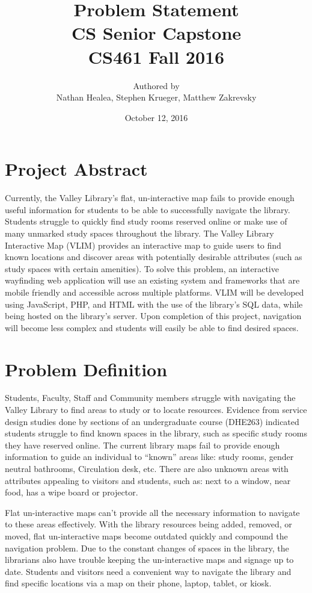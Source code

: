 \documentclass[letterpaper,10pt,titlepage]{article}
\title{Problem Statement \\ CS Senior Capstone \\ \vspace{2mm}\small CS461 Fall 2016}
\author{Authored by \\ Nathan Healea, Stephen Krueger, Matthew Zakrevsky}
\date{October 12, 2016}
\begin{document}
\maketitle
\newpage

\section*{Project Abstract}
Currently, the Valley Library's flat, un-interactive map fails to provide enough useful information for students to be able to successfully navigate the library. Students struggle to quickly find study rooms reserved online or make use of many unmarked study spaces throughout the library. The Valley Library Interactive Map (VLIM) provides an interactive map to guide users to find known locations and discover areas with potentially desirable attributes (such as study spaces with certain amenities). To solve this problem, an interactive wayfinding web application will use an existing system and frameworks that are mobile friendly and accessible across multiple platforms. VLIM will be developed using JavaScript, PHP, and HTML with the use of the library's SQL data, while being hosted on the library's server. Upon completion of this project, navigation will become less complex and students will easily be able to find desired spaces.

\section*{Problem Definition}
Students, Faculty, Staff and Community members struggle with navigating the Valley Library to find areas to study or to locate resources. Evidence from service design studies done by sections of an undergraduate course (DHE263) indicated students struggle to find known spaces in the library, such as specific study rooms they have reserved online. The current library maps fail to provide enough information to guide an individual to “known” areas like: study rooms, gender neutral bathrooms, Circulation desk, etc. There are also unknown areas with attributes appealing to visitors and students, such as: next to a window, near food, has a wipe board or projector. 

Flat un-interactive maps can’t provide all the necessary information to navigate to these areas effectively. With the library resources being added, removed, or moved, flat un-interactive maps become outdated quickly and compound the navigation problem. Due to the constant changes of spaces in the library, the librarians also have trouble keeping the un-interactive maps and signage up to date. Students and visitors need a convenient way to navigate the library and find specific locations via a map on their phone, laptop, tablet, or kiosk. 
\end{document}
